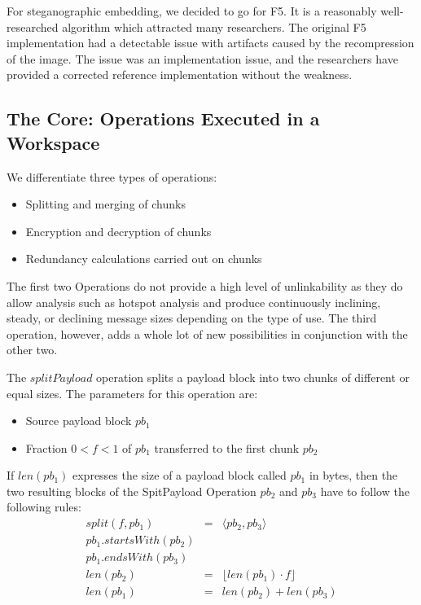 \documentclass[acmsmall, screen, review]{acmart}
\begin{document}
	For steganographic embedding, we decided to go for F5\cite{f5}. It is a reasonably well-researched algorithm which attracted many researchers. The original F5 implementation had a detectable issue with artifacts\cite{F5broken} caused by the recompression of the image. The issue was an implementation issue, and the researchers have provided a corrected reference implementation without the weakness. %
	
	\subsection{The Core: Operations Executed in a Workspace}
	We differentiate three types of operations:
	\begin{itemize}
		\item Splitting and merging of chunks
		\item Encryption and decryption of chunks
		\item Redundancy calculations carried out on chunks
	\end{itemize}
	
	The first two Operations do not provide a high level of unlinkability as they do allow analysis such as hotspot analysis and produce continuously inclining, steady, or declining message sizes depending on the type of use. The third operation, however, adds a whole lot of new possibilities in conjunction with the other two.
	
	The $splitPayload$ operation splits a payload block into two chunks of different or equal sizes. The parameters for this operation are:
	\begin{itemize}
		\item Source payload block $pb_1$
		\item Fraction $0<f<1$ of $pb_1$ transferred to the first chunk $pb_2$
	\end{itemize}
	
	If $len(pb_1)$ expresses the size of a payload block called $pb_1$ in bytes, then the two resulting blocks of the SpitPayload Operation $pb_2$ and $pb_3$ have to follow the following rules:
	\begin{eqnarray}
	split(f, pb_1) & = &\langle pb_2, pb_3 \rangle\\
	pb_1.startsWith(pb_2)\\
	pb_1.endsWith(pb_3)\\
	len(pb_2) & = & \lfloor len(pb_1)\cdot f\rfloor\\
	len(pb_1) & = & len(pb_2) + len(pb_3)
	\end{eqnarray}
	
\end{document}
